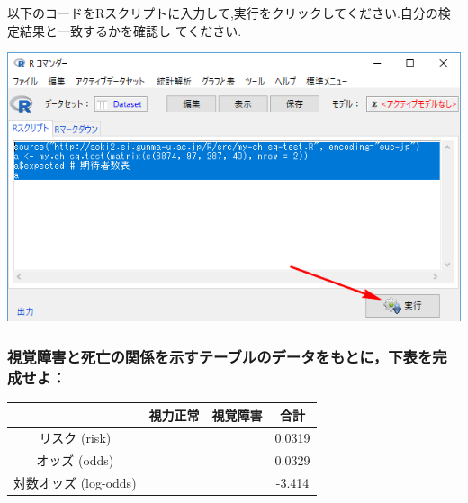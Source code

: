\documentclass[11pt,]{problemset}
\newenvironment{Shaded}{\begin{snugshade}}{\end{snugshade}}
\newcommand{\CommentTok}[1]{\textcolor[rgb]{0.56,0.35,0.01}{\textit{#1}}}
\newcommand{\DataTypeTok}[1]{\textcolor[rgb]{0.13,0.29,0.53}{#1}}
\newcommand{\DecValTok}[1]{\textcolor[rgb]{0.00,0.00,0.81}{#1}}
\newcommand{\KeywordTok}[1]{\textcolor[rgb]{0.13,0.29,0.53}{\textbf{#1}}}
\newcommand{\NormalTok}[1]{#1}
\newcommand{\OperatorTok}[1]{\textcolor[rgb]{0.81,0.36,0.00}{\textbf{#1}}}
\newcommand{\StringTok}[1]{\textcolor[rgb]{0.31,0.60,0.02}{#1}}
\begin{document}
以下のコードをRスクリプトに入力して,実行をクリックしてください.自分の検定結果と一致するかを確認し
てください.

\begin{Shaded}
\end{Shaded}

\begin{center}\includegraphics[width=0.8\linewidth]{pic/mychisqtest01cut} \end{center}

\subsubsection{視覚障害と死亡の関係を示すテーブルのデータをもとに，下表を完成せよ：}

\begin{center}
\begin{tabular}{|c|c|c|c|}
\hline
                 & 視力正常   & 視覚障害    & 合計   \\ \hline
リスク (risk)       &  &   & 0.0319 \\ \hline
オッズ (odds)       &  &   & 0.0329 \\ \hline
対数オッズ (log-odds) &  &  & -3.414 \\ \hline
\end{tabular}
\end{center}
\end{document}

